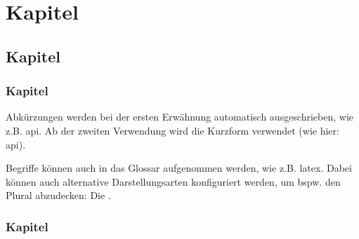 \chapter{Kapitel}

\section{Kapitel}

\subsection{Kapitel}\label{sec:section-label-1}

Abkürzungen werden bei der ersten Erwähnung automatisch ausgeschrieben, wie z.B. \gls{api}.
Ab der zweiten Verwendung wird die Kurzform verwendet (wie hier: \gls{api}).

Begriffe können auch in das Glossar aufgenommen werden, wie z.B. \gls{latex}.
Dabei können auch alternative Darstellungsarten konfiguriert werden, um bspw. den Plural abzudecken: Die .

\subsection{Kapitel}
